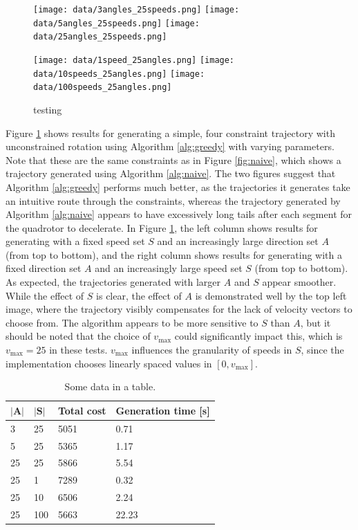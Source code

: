 \documentclass[pageno]{jpaper}
\begin{document}
\begin{figure}[htbb]
  \begin{minipage}[b]{0.5\linewidth}
    \texttt{[image: data/3angles\_25speeds.png]}
    \texttt{[image: data/5angles\_25speeds.png]}
    \texttt{[image: data/25angles\_25speeds.png]}
  \end{minipage}
  \begin{minipage}[b]{0.5\linewidth}
    \texttt{[image: data/1speed\_25angles.png]}
    \texttt{[image: data/10speeds\_25angles.png]}
    \texttt{[image: data/100speeds\_25angles.png]}
  \end{minipage}
  \caption{testing}
  \label{fig:greedy}
\end{figure}

Figure \ref{fig:greedy} shows results for generating a simple, four constraint trajectory with unconstrained rotation using Algorithm \ref{alg:greedy} with varying parameters. Note that these are the same constraints as in Figure \ref{fig:naive}, which shows a trajectory generated using Algorithm \ref{alg:naive}. The two figures suggest that Algorithm \ref{alg:greedy} performs much better, as the trajectories it generates take an intuitive route through the constraints, whereas the trajectory generated by Algorithm \ref{alg:naive} appears to have excessively long tails after each segment for the quadrotor to decelerate. In Figure \ref{fig:greedy}, the left column shows results for generating with a fixed speed set $S$ and an increasingly large direction set $A$ (from top to bottom), and the right column shows results for generating with a fixed direction set $A$ and an increasingly large speed set $S$ (from top to bottom). As expected, the trajectories generated with larger $A$ and $S$ appear smoother. While the effect of $S$ is clear, the effect of $A$ is demonstrated well by the top left image, where the trajectory visibly compensates for the lack of velocity vectors to choose from. The algorithm appears to be more sensitive to $S$ than $A$, but it should be noted that the choice of $v_{\max}$ could significantly impact this, which is $v_{\max} = 25$ in these tests. $v_{\max}$ influences the granularity of speeds in $S$, since the implementation chooses linearly spaced values in $[0, v_{\max}]$.

\begin{table}[hbt]
  \centering
  \begin{tabular}{|l|l|l|l|} \hline
    $|\textbf{A}|$ & $|\textbf{S}|$ & \textbf{Total cost} & \textbf{Generation time [s]} \\ \hline
    3 & 25 & 5051 & 0.71 \\ \hline
    5 & 25 & 5365 & 1.17 \\ \hline
    25 & 25 & 5866 & 5.54 \\ \hline
    25 & 1 & 7289 & 0.32 \\ \hline
    25 & 10 & 6506 & 2.24 \\ \hline
    25 & 100 & 5663 & 22.23 \\ \hline
  \end{tabular}
  \caption{Some data in a table. }
  \label{table:total}
\end{table}
\end{document}
